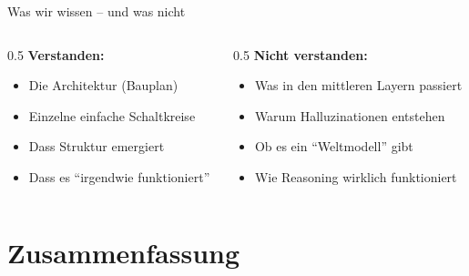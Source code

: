\documentclass[aspectratio=169,14pt]{beamer}
\begin{document}
\begin{frame}{Was wir wissen -- und was nicht}
\begin{columns}
\begin{column}{0.5\textwidth}
\textbf{Verstanden:}
\begin{itemize}
\item Die Architektur (Bauplan)
\item Einzelne einfache Schaltkreise
\item Dass Struktur emergiert
\item Dass es ``irgendwie funktioniert''
\end{itemize}
\end{column}
\begin{column}{0.5\textwidth}
\textbf{Nicht verstanden:}
\begin{itemize}
\item Was in den mittleren Layern passiert
\item Warum Halluzinationen entstehen
\item Ob es ein ``Weltmodell'' gibt
\item Wie Reasoning wirklich funktioniert
\end{itemize}
\end{column}
\end{columns}
\vspace{0.5cm}
\centering
{}
\end{frame}

\section{Zusammenfassung}
\end{document}
